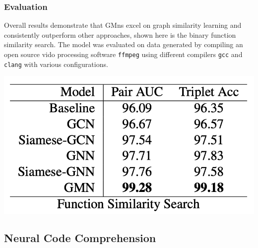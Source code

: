 \documentclass{article}
\begin{document}
\subsubsection{Evaluation}
Overall results demonstrate that GMns excel on graph similarity learning and consistently outperform other approaches, shown here is the binary function similarity search.
The model was evaluated on data generated by compiling an open source vido processing software \texttt{ffmpeg} using different compilers \texttt{gcc} and \texttt{clang} with various configurations.
\centerline{\includegraphics[width=\columnwidth]{Images/Similarity3-1.png}}

\subsection{Neural Code Comprehension \cite{ben2018neural}}
\end{document}
